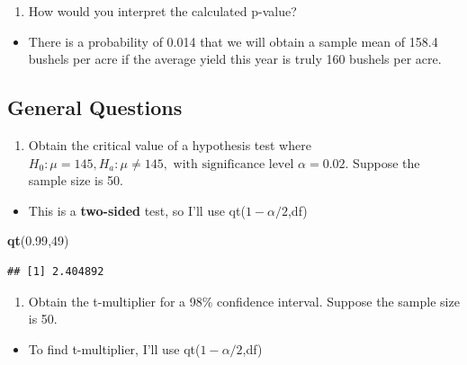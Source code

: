 \documentclass[
  openany]{book}
\newenvironment{Shaded}{\begin{snugshade}}{\end{snugshade}}
\newcommand{\DecValTok}[1]{\textcolor[rgb]{0.00,0.00,0.81}{#1}}
\newcommand{\FloatTok}[1]{\textcolor[rgb]{0.00,0.00,0.81}{#1}}
\newcommand{\FunctionTok}[1]{\textcolor[rgb]{0.13,0.29,0.53}{\textbf{#1}}}
\newcommand{\NormalTok}[1]{#1}
\providecommand{\tightlist}{%
  \setlength{\itemsep}{0pt}\setlength{\parskip}{0pt}}
\begin{document}
\begin{enumerate}
\def\labelenumi{\alph{enumi}.}
\setcounter{enumi}{4}
\tightlist
\item
  How would you interpret the calculated p-value?
\end{enumerate}

\begin{itemize}
\tightlist
\item
  There is a probability of 0.014 that we will obtain a sample mean of 158.4 bushels per acre if the average yield this year is truly 160 bushels per acre.
\end{itemize}

\subsection{General Questions}\label{general-questions}

\begin{enumerate}
\def\labelenumi{\arabic{enumi}.}
\setcounter{enumi}{16}
\tightlist
\item
  Obtain the critical value of a hypothesis test where \(H_0: \mu=145,H_a: \mu \ne 145,\text{ with significance level } \alpha=0.02\). Suppose the sample size is 50.
\end{enumerate}

\begin{itemize}
\tightlist
\item
  This is a \textbf{two-sided} test, so I'll use qt(\(1-\alpha/2\),df)
\end{itemize}

\begin{Shaded}
\begin{Highlighting}[]
\FunctionTok{qt}\NormalTok{(}\FloatTok{0.99}\NormalTok{,}\DecValTok{49}\NormalTok{)}
\end{Highlighting}
\end{Shaded}

\begin{verbatim}
## [1] 2.404892
\end{verbatim}

\begin{enumerate}
\def\labelenumi{\arabic{enumi}.}
\setcounter{enumi}{17}
\tightlist
\item
  Obtain the t-multiplier for a 98\% confidence interval. Suppose the sample size is 50.
\end{enumerate}

\begin{itemize}
\tightlist
\item
  To find t-multiplier, I'll use qt(\(1-\alpha/2\),df)
\end{itemize}
\end{document}
